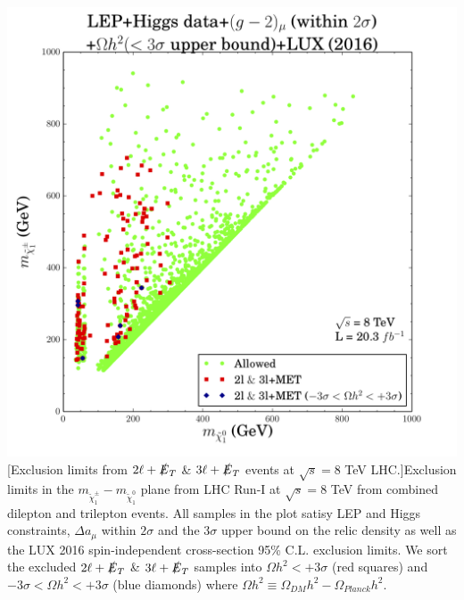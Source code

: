 \begin{center}
\includegraphics[scale=0.5]{figures/plot8TeV.png}
[Exclusion limits from $2\ell+\slashed{E}_T$ \& $3\ell+\slashed{E}_T$ events at $\sqrt{s}=8$ TeV LHC.]{Exclusion limits in the $m_{\tilde{\chi}^{\pm}_1} - m_{\tilde{\chi}^{0}_1}$ plane from LHC Run-I at $\sqrt{s}=8$ TeV from combined dilepton and trilepton events. All samples in the plot satisy LEP and Higgs constraints, $\Delta a_{\mu}$ within $2\sigma$ and the $3\sigma$ upper bound on the relic density as well as the LUX 2016 spin-independent cross-section 95\% C.L. exclusion limits. We sort the excluded $2\ell+\slashed{E}_T$ \& $3\ell+\slashed{E}_T$ samples into $\Omega h^2<+3\sigma$ (red squares) and $-3\sigma <\Omega h^2<+3\sigma$ (blue diamonds) where $\Omega h^2 \equiv \Omega_{DM} h^2 - \Omega_{Planck} h^2$.}
\label{fig:8Tevplot}
\end{center}

